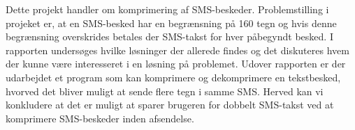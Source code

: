 Dette projekt handler om komprimering af SMS-beskeder. Problemstilling i projeket er, at en SMS-besked har en begrænsning på 160 tegn og hvis denne begrænsning overskrides betales der SMS-takst for hver påbegyndt besked. I rapporten undersøges hvilke løsninger der allerede findes og det diskuteres hvem der kunne være interesseret i en løsning på problemet. Udover rapporten er der udarbejdet et program som kan komprimere og dekomprimere en tekstbesked, hvorved det bliver muligt at sende flere tegn i samme SMS. Herved kan vi konkludere at det er muligt at sparer brugeren for dobbelt SMS-takst ved at komprimere SMS-beskeder inden afsendelse.